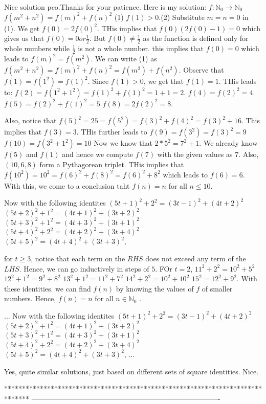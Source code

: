 \begin{solution}
	Nice solution pco.Thanks for your patience.
Here is my solution:
 $ f: \mathbb{N}_{0}\to\mathbb{N}_{0}$ 
$ f(m^{2} + n^{2}) = f(m)^{2} + f(n)^{2}$ (1)
$ f(1) > 0$.(2)
Substitute  $ m = n = 0$ in (1). We get 
$ f(0) = 2 f(0)^2$. THis implies that $ f(0)(2f(0)-1)=0$ which gives us that $ f(0)=0 or \frac{1}{2}$. But $ f(0) \ne \frac{1}{2}$ as the function is defined only for whole numbers while $ \frac{1}{2}$ is not a whole number. this implies that $ f(0) = 0$ which leads to $ f(m)^2 = f(m^2)$.
We can write (1) as $ f(m^2 + n^2) = f(m)^2 + f(n)^2 = f(m^2) + f(n^2)$.
Observe that $ f(1) = f(1^2) = f(1)^2$. Since $ f(1) > 0$,  we get that $ f(1) = 1$.
THis leads to:
$ f(2) = f(1^2 + 1^2) = f(1)^2 + f(1)^2 = 1 + 1 = 2$.
$ f(4) = f(2)^2 = 4$.
$ f(5) = f(2)^2 + f(1)^2 = 5$
$ f(8) = 2 f(2)^2 = 8$.

Also, notice that $ f(5)^2 = 25 = f(5^2) = f(3)^2 + f(4)^2 = f(3)^2 + 16.$
This implies that $ f(3) = 3$.
THis further leads to 
$ f(9) = f(3^2) = f(3)^2 = 9$
$ f(10) = f(3^2 + 1^2) = 10$
Now we know that $ 2* 5^2 = 7^2 + 1$.
We already know $ f(5)$ and $ f(1)$ and hence we compute $ f(7)$ with the given values as $ 7$.
Also, $ (10,6,8)$ form a Pythagorean triplet.
THis implies that $ f(10^2) = 10^2 = f(6)^2 + f(8)^2 = f(6)^2 + 8^2$ which leads to $ f(6) = 6$.
With this, we come to a conclusion taht $ f(n) = n$ for all $ n \le 10$.

Now with the following identites
$ (5t + 1)^2 + 2^2 = (3t - 1)^2 + (4t + 2)^2$
$ (5t + 2)^2 + 1^2 = (4t + 1)^2 + (3t + 2)^2$
$ (5t + 3)^2 + 1^2 = (4t + 3)^2 + (3t + 1)^2$
$ (5t + 4)^2 + 2^2 = (4t + 2)^2 + (3t + 4)^2$
$ (5t + 5)^2 = (4t + 4)^2 + (3t + 3)^2$,

for $ t \ge 3$, notice that each term on the $ RHS$ does not exceed any term of the $ LHS$. Hence, we can go inductively in steps of $ 5$.
FOr $ t = 2$, $ 11^2 + 2^2 = 10^2 + 5^2$
                 $ 12^2 + 1^2 = 9^2 + 8^2$
                 $ 13^2 + 1^2 = 11^2 + 7^2$
                 $ 14^2 + 2^2 = 10^2 + 10^2$
                 $ 15^2 = 12^2 + 9^2$.
With these identities.  we can find $ f(n)$ by knowing the values of $ f$ of smaller numbers.
Hence, $ f(n) = n$ for all $ n \in \mathbb{N}_{0}$ .
\end{solution}



\begin{solution}
	\begin{tcolorbox} ...
Now with the following identites
$ (5t + 1)^2 + 2^2 = (3t - 1)^2 + (4t + 2)^2$
$ (5t + 2)^2 + 1^2 = (4t + 1)^2 + (3t + 2)^2$
$ (5t + 3)^2 + 1^2 = (4t + 3)^2 + (3t + 1)^2$
$ (5t + 4)^2 + 2^2 = (4t + 2)^2 + (3t + 4)^2$
$ (5t + 5)^2 = (4t + 4)^2 + (3t + 3)^2$,
...\end{tcolorbox}

Yes, quite similar solutions, just based on different sets of square identities.
Nice.
\end{solution}
*******************************************************************************
-------------------------------------------------------------------------------

